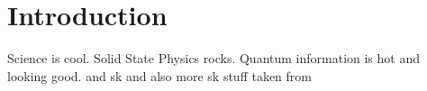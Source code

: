 \chapter{Introduction}
\label{ch:introduction}
Science is cool. Solid State Physics rocks. Quantum information is hot and looking good. and \ac{sk} and also more \ac{sk} stuff taken from \cite{Slater1954}
